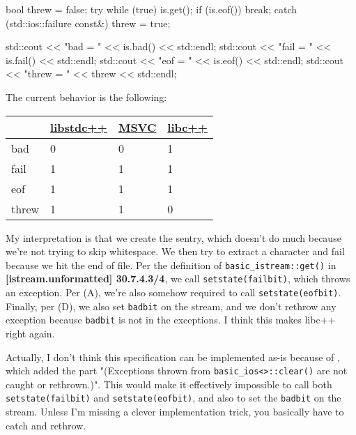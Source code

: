 \documentclass{wg21}
\newcommand{\cc}[1]{\texttt{#1}}
\begin{document}
\begin{enumerate}
\begin{cpp}
{      bool threw = false;
      try {
          while (true) {
              is.get();
              if (is.eof())
                  break;
          }
      } catch (std::ios::failure const&) {
          threw = true;
      }

      std::cout << "bad = " << is.bad() << std::endl;
      std::cout << "fail = " << is.fail() << std::endl;
      std::cout << "eof = " << is.eof() << std::endl;
      std::cout << "threw = " << threw << std::endl;
  }
  \end{cpp}

  The current behavior is the following:
  \begin{center}
  \begin{tabular}{| l | l | l | l |}
  \hline
         & \href{https://wandbox.org/permlink/jSSGM6TcqLzZSl6M}{libstdc++}
         & \href{http://rextester.com/OPIJW60076}{MSVC}
         & \href{https://wandbox.org/permlink/O302uzC1VW0nW1Pn}{libc++} \\ \hline
  bad    & 0         & 0    & 1      \\ \hline
  fail   & 1         & 1    & 1      \\ \hline
  eof    & 1         & 1    & 1      \\ \hline
  threw  & 1         & 1    & 0      \\ \hline
  \end{tabular}
  \end{center}

  My interpretation is that we create the sentry, which doesn't do much because we're not trying to skip whitespace. We then try to extract a character and fail because we hit the end of file. Per the definition of \cc{basic_istream::get()} in \textbf{[istream.unformatted] 30.7.4.3/4}, we call \cc{setstate(failbit)}, which throws an exception. Per (A), we're also somehow required to call \cc{setstate(eofbit)}. Finally, per (D), we also set \cc{badbit} on the stream, and we don't rethrow any exception because \cc{badbit} is not in the exceptions. I think this makes libc++ right again.

  Actually, I don't think this specification can be implemented as-is because of \cite{LWG61}, which added the part "(Exceptions thrown from \cc{basic_ios<>::clear()} are not caught or rethrown.)". This would make it effectively impossible to call both \cc{setstate(failbit)} and \cc{setstate(eofbit)}, and also to set the \cc{badbit} on the stream. Unless I'm missing a clever implementation trick, you basically have to catch and rethrow.
\end{enumerate}
\end{document}
